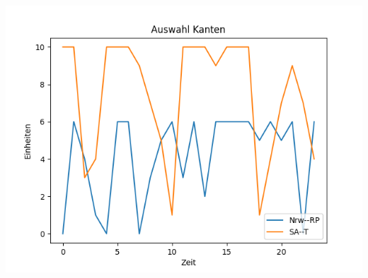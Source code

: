 \documentclass[aspectratio=169,t]{beamer}
\begin{document}
\begin{frame}
	\frametitle{}
	\vspace*{4mm}
	\begin{minipage}{0.9\linewidth}
		
		
			\centering
			\includegraphics[width=0.6\linewidth]{Figure_3.png}
			
	\end{minipage}	
	
	
	
\end{frame}
	
	
\end{document}
